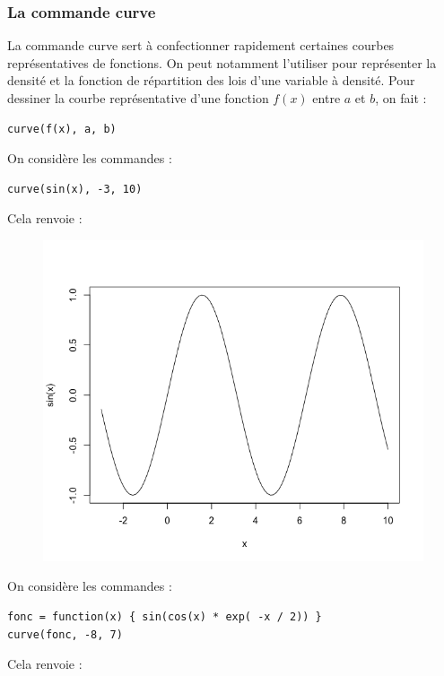 \subsubsection{La commande curve}
La commande curve sert à confectionner rapidement certaines courbes représentatives de fonctions. On peut notamment l'utiliser pour représenter la densité et la fonction de répartition des lois d'une
variable à densité.\newline
Pour dessiner la courbe représentative d'une fonction $f(x)$ entre $a$ et $b$, on fait :
\begin{lstlisting}[language=html]
curve(f(x), a, b)
\end{lstlisting}
On considère les commandes :
\begin{lstlisting}[language=html]
curve(sin(x), -3, 10)
\end{lstlisting}
Cela renvoie :
\begin{figure}[H]\begin{center}\includegraphics[scale=0.4]{ilu/gra26.png}\end{center}\end{figure}
On considère les commandes :
\begin{lstlisting}[language=html]
fonc = function(x) { sin(cos(x) * exp( -x / 2)) }
curve(fonc, -8, 7)
\end{lstlisting}
Cela renvoie :
